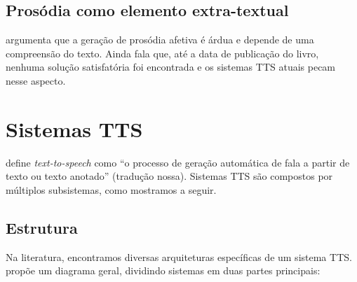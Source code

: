 \subsection{Prosódia como elemento extra-textual}
 argumenta que a geração de prosódia afetiva é árdua e
depende de uma compreensão do texto. Ainda fala que, até a data de publicação do
livro, nenhuma solução satisfatória foi encontrada e os sistemas TTS atuais
pecam nesse aspecto.

\section{Sistemas TTS}
 define \emph{text-to-speech} como ``o processo de geração
automática de fala a partir de texto ou texto anotado'' (tradução nossa).
Sistemas TTS são compostos por múltiplos subsistemas, como mostramos a seguir.

\subsection{Estrutura}
Na literatura, encontramos diversas arquiteturas específicas de um sistema TTS.
 propõe um diagrama geral, dividindo sistemas em duas partes principais:

